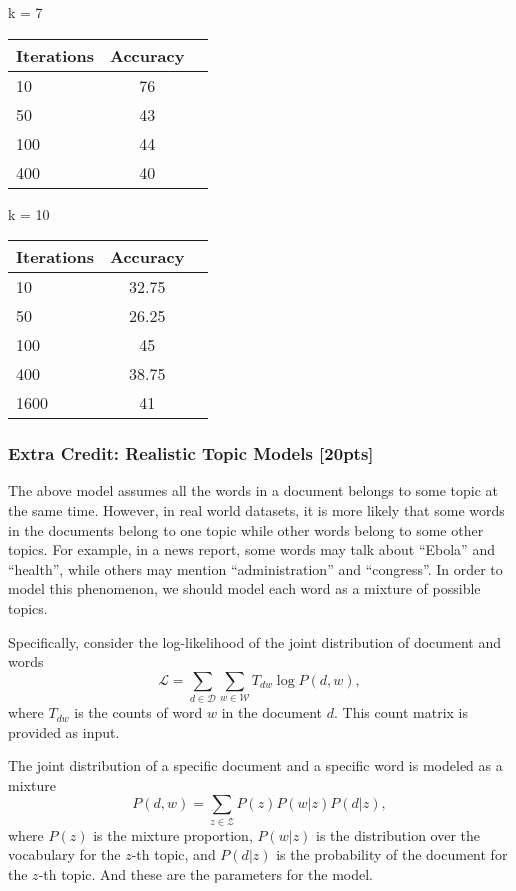 \documentclass[twoside,10pt]{article}
\begin{document}
k = 7\\
\begin{table}[!h]
\centering \small
\begin{tabular}{l|c|c}
  \hline
  Iterations & Accuracy \\
  \hline \hline
  10 & 76\\
  50 & 43\\
  100 & 44\\
  400 & 40\\
  \hline
\end{tabular}
\end{table}

k = 10\\
\begin{table}[!h]
\centering \small
\begin{tabular}{l|c|c}
  \hline
  Iterations & Accuracy \\
  \hline \hline
  10 & 32.75\\
  50 & 26.25\\
  100 & 45\\
  400 & 38.75\\
  1600 & 41\\
  \hline
\end{tabular}
\end{table}

\subsubsection*{Extra Credit: Realistic Topic Models [20pts]}
The above model assumes all the words in a document belongs to some topic at the same time. However, in real world datasets, it is more likely that
some words in the documents belong to one topic while other words belong to some other topics. For example, in a news report, some words may talk about ``Ebola'' and ``health'', while others may mention ``administration'' and ``congress''. In order to model this phenomenon, we should model each word as a mixture of possible topics.

Specifically, consider the log-likelihood of the joint distribution of document and words
\begin{equation}
\mathcal{L} = \sum_{d\in \mathcal{D}}\sum_{w \in \mathcal{W}} T_{dw} \log P(d, w),
\end{equation}
where $T_{dw}$ is the counts of word $w$ in the document $d$. This count matrix is provided as input.

The joint distribution of a specific document and a specific word is modeled as a mixture
\begin{equation}
P(d, w) = \sum_{z \in \mathcal{Z}} P(z) P(w|z) P(d|z),
\end{equation}
where $P(z)$ is the mixture proportion, $P(w|z)$ is the distribution over the vocabulary for the $z$-th topic, and $P(d|z)$ is the probability of the document for the $z$-th topic. And these are the parameters for the model.
\end{document}
